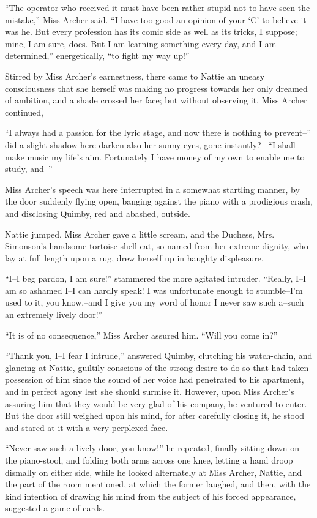 ``The operator who received it must have been rather stupid not to have
seen the mistake,'' Miss Archer said. ``I have too good an opinion of your
`C' to believe it was he. But every profession has its comic side as
well as its tricks, I suppose; mine, I am sure, does. But I am learning
something every day, and I am determined,'' energetically, ``to fight my
way up!''

Stirred by Miss Archer's earnestness, there came to Nattie an uneasy
consciousness that she herself was making no progress towards her only
dreamed of ambition, and a shade crossed her face; but without observing
it, Miss Archer continued,

``I always had a passion for the lyric stage, and now there is nothing to
prevent--'' did a slight shadow here darken also her sunny eyes, gone
instantly?-- ``I shall make music my life's aim. Fortunately I have money
of my own to enable me to study, and--''

Miss Archer's speech was here interrupted in a somewhat startling
manner, by the door suddenly flying open, banging against the piano with
a prodigious crash, and disclosing Quimby, red and abashed, outside.

Nattie jumped, Miss Archer gave a little scream, and the Duchess, Mrs.
Simonson's handsome tortoise-shell cat, so named from her extreme
dignity, who lay at full length upon a rug, drew herself up in haughty
displeasure.

``I--I beg pardon, I am sure!'' stammered the more agitated intruder.
``Really, I--I am so ashamed I--I can hardly speak! I was unfortunate
enough to stumble--I'm used to it, you know,--and I give you my word of
honor I never saw such a--such an extremely lively door!''

``It is of no consequence,'' Miss Archer assured him. ``Will you come in?''

``Thank you, I--I fear I intrude,'' answered Quimby, clutching his
watch-chain, and glancing at Nattie, guiltily conscious of the strong
desire to do so that had taken possession of him since the sound of her
voice had penetrated to his apartment, and in perfect agony lest she
should surmise it. However, upon Miss Archer's assuring him that they
would be very glad of his company, he ventured to enter. But the door
still weighed upon his mind, for after carefully closing it, he stood
and stared at it with a very perplexed face.

``Never saw such a lively door, you know!'' he repeated, finally sitting
down on the piano-stool, and folding both arms across one knee, letting
a hand droop dismally on either side, while he looked alternately at
Miss Archer, Nattie, and the part of the room mentioned, at which the
former laughed, and then, with the kind intention of drawing his mind
from the subject of his forced appearance, suggested a game of cards.

